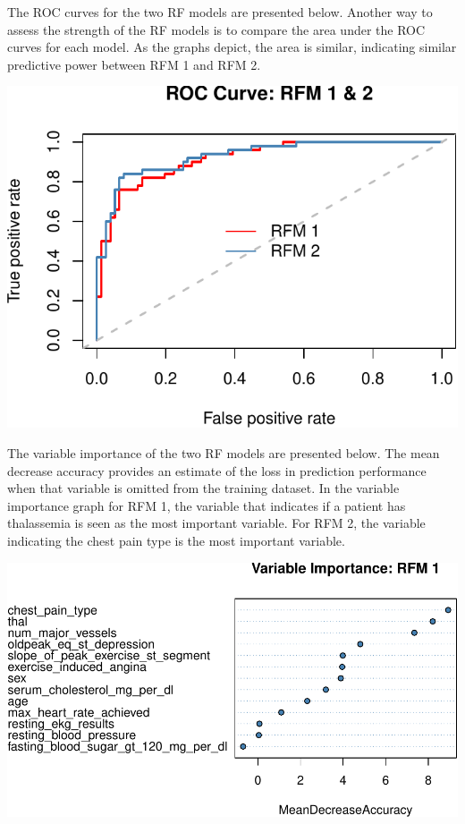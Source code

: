 \documentclass[11pt,preprint, authoryear]{elsarticle}
\numberwithin{equation}{section}
\numberwithin{figure}{section}
\numberwithin{table}{section}
\begin{document}
The ROC curves for the two RF models are presented below. Another way to
assess the strength of the RF models is to compare the area under the
ROC curves for each model. As the graphs depict, the area is similar,
indicating similar predictive power between RFM 1 and RFM 2.

\begin{center}\includegraphics{ML_project_files/figure-latex/unnamed-chunk-12-1} \end{center}

The variable importance of the two RF models are presented below. The
mean decrease accuracy provides an estimate of the loss in prediction
performance when that variable is omitted from the training dataset. In
the variable importance graph for RFM 1, the variable that indicates if
a patient has thalassemia is seen as the most important variable. For
RFM 2, the variable indicating the chest pain type is the most important
variable.

\begin{center}\includegraphics{ML_project_files/figure-latex/unnamed-chunk-13-1} \end{center}
\end{document}
